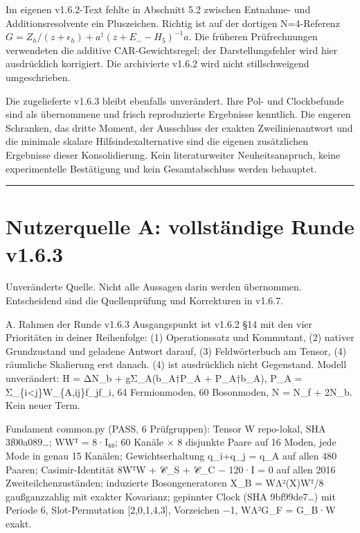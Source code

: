 Im eigenen v1.6.2-Text fehlte in Abschnitt 5.2 zwischen Entnahme- und
Additionsresolvente ein Pluszeichen. Richtig ist auf der dortigen
N=4-Referenz \(G=Z_h/(z+\epsilon_h)+a^\dagger(z+E_--H_5)^{-1}a\). Die
früheren Prüfrechnungen verwendeten die additive CAR-Gewichtsregel; der
Darstellungsfehler wird hier ausdrücklich korrigiert. Die archivierte
v1.6.2 wird nicht stillschweigend umgeschrieben.

Die zugelieferte v1.6.3 bleibt ebenfalls unverändert. Ihre Pol- und
Clockbefunde sind als übernommene und frisch reproduzierte Ergebnisse
kenntlich. Die engeren Schranken, das dritte Moment, der Ausschluss der
exakten Zweilinienantwort und die minimale skalare Hilfsindexalternative
sind die eigenen zusätzlichen Ergebnisse dieser Konsolidierung. Kein
literaturweiter Neuheitsanspruch, keine experimentelle Bestätigung und
kein Gesamtabschluss werden behauptet.

\begin{center}\rule{0.5\linewidth}{0.5pt}\end{center}

\section{Nutzerquelle A: vollständige Runde
v1.6.3}\label{nutzerquelle-a-vollstuxe4ndige-runde-v1.6.3}

Unveränderte Quelle. Nicht alle Aussagen darin werden übernommen.
Entscheidend sind die Quellenprüfung und Korrekturen in v1.6.7.

A. Rahmen der Runde v1.6.3 Ausgangspunkt ist v1.6.2 §14 mit den vier
Prioritäten in deiner Reihenfolge: (1) Operationssatz und Kommutant, (2)
nativer Grundzustand und geladene Antwort darauf, (3) Feldwörterbuch am
Tensor, (4) räumliche Skalierung erst danach. (4) ist ausdrücklich nicht
Gegenstand. Modell unverändert: H = ΔN\_b + gΣ\_A(b\_A†P\_A +
P\_A†b\_A), P\_A = Σ\_\{i\textless j\}W\_\{A,ij\}f\_jf\_i, 64
Fermionmoden, 60 Bosonmoden, N = N\_f + 2N\_b. Kein neuer Term.

Fundament common.py (PASS, 6 Prüfgruppen): Tensor W repo-lokal, SHA
3f00a089\ldots; WWᵀ = 8·I₆₀; 60 Kanäle × 8 disjunkte Paare auf 16 Moden,
jede Mode in genau 15 Kanälen; Gewichtserhaltung q\_i+q\_j = q\_A auf
allen 480 Paaren; Casimir-Identität 8WᵀW + 𝒞\_S + 𝒞\_C − 120·I = 0 auf
allen 2016 Zweiteilchenzuständen; induzierte Bosongeneratoren X\_B =
WΛ²(X)Wᵀ/8 gaußganzzahlig mit exakter Kovarianz; gepinnter Clock (SHA
9bf99de7\ldots) mit Periode 6, Slot-Permutation {[}2,0,1,4,3{]},
Vorzeichen −1, WΛ²G\_F = G\_B·W exakt.

